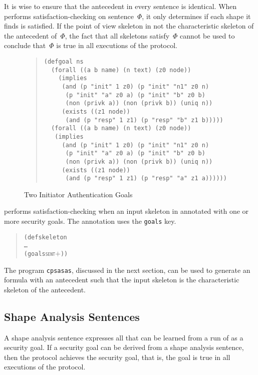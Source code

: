 \documentclass[12pt]{article}
\begin{document}
It is wise to ensure that the antecedent in every sentence is
identical.  When {\cpsa} performs satisfaction-checking on
sentence~$\Phi$, it only determines if each shape it finds is
satisfied.  If the point of view skeleton in not the characteristic
skeleton of the antecedent of~$\Phi$, the fact that all skeletons
satisfy~$\Phi$ cannot be used to conclude that~$\Phi$ is true in all
executions of the protocol.

\begin{figure}
\begin{quote}
\begin{verbatim}
(defgoal ns
  (forall ((a b name) (n text) (z0 node))
    (implies
     (and (p "init" 1 z0) (p "init" "n1" z0 n)
      (p "init" "a" z0 a) (p "init" "b" z0 b)
      (non (privk a)) (non (privk b)) (uniq n))
     (exists ((z1 node))
      (and (p "resp" 1 z1) (p "resp" "b" z1 b)))))
  (forall ((a b name) (n text) (z0 node))
   (implies
     (and (p "init" 1 z0) (p "init" "n1" z0 n)
      (p "init" "a" z0 a) (p "init" "b" z0 b)
      (non (privk a)) (non (privk b)) (uniq n))
     (exists ((z1 node))
      (and (p "resp" 1 z1) (p "resp" "a" z1 a))))))
\end{verbatim}
\end{quote}
\caption{Two Initiator Authentication Goals}\label{fig:ns init goals}
\end{figure}

{\cpsa} performs satisfaction-checking when an input skeleton in annotated
with one or more security goals.  The annotation uses the
\texttt{goals} key.

\begin{quote}
  \begin{alltt}
(defskeleton
   \ldots
   (goals \textsc{sent\ensuremath{+}}))
  \end{alltt}
\end{quote}

The program \texttt{cpsasas}, discussed in the next section, can be
used to generate an formula with an antecedent such that the input
skeleton is the characteristic skeleton of the antecedent.

\subsection{Shape Analysis Sentences}\label{sec:sas}

A shape analysis sentence expresses all that can be learned from a run
of {\cpsa} as a security goal.  If a security goal can be derived from
a shape analysis sentence, then the protocol achieves the security
goal, that is, the goal is true in all executions of the protocol.
\end{document}
